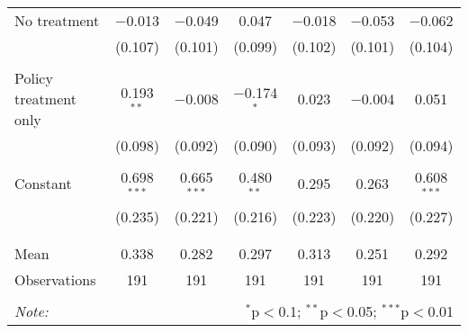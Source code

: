 \begin{tabular}{@{\extracolsep{5pt}}lcccccc}
 No treatment & $-$0.013 & $-$0.049 & 0.047 & $-$0.018 & $-$0.053 & $-$0.062 \\ 
  & (0.107) & (0.101) & (0.099) & (0.102) & (0.101) & (0.104) \\ 
  & & & & & & \\ 
 Policy treatment only & 0.193$^{**}$ & $-$0.008 & $-$0.174$^{*}$ & 0.023 & $-$0.004 & 0.051 \\ 
  & (0.098) & (0.092) & (0.090) & (0.093) & (0.092) & (0.094) \\ 
  & & & & & & \\ 
 Constant & 0.698$^{***}$ & 0.665$^{***}$ & 0.480$^{**}$ & 0.295 & 0.263 & 0.608$^{***}$ \\ 
  & (0.235) & (0.221) & (0.216) & (0.223) & (0.220) & (0.227) \\ 
  & & & & & & \\ 
\hline \\[-1.8ex] 
Mean & 0.338 & 0.282 & 0.297 & 0.313 & 0.251 & 0.292 \\ 
Observations & 191 & 191 & 191 & 191 & 191 & 191 \\ 
\hline 
\hline \\[-1.8ex] 
\textit{Note:}  & \multicolumn{6}{r}{$^{*}$p$<$0.1; $^{**}$p$<$0.05; $^{***}$p$<$0.01} \\ 
\end{tabular} 
